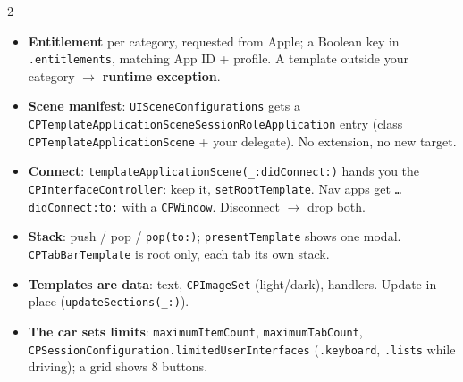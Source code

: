 \documentclass[8pt]{extarticle}
\newcommand\ct[1]{\texttt{#1}}
\newcommand\hd[1]{\par\vspace{3pt}\noindent{\bfseries\color{sheetBlue}#1}\par\vspace{1pt}}
\begin{document}
\begin{multicols}{2}
\raggedright{}

\hd{How it works}
\begin{itemize}
  \item \textbf{Entitlement} per category, requested from Apple; a Boolean key in
        \ct{.entitlements}, matching App ID + profile. A template outside your category
        $\to$ \textbf{runtime exception}.
  \item \textbf{Scene manifest}: \ct{UISceneConfigurations} gets a
        \ct{CPTemplateApplicationScene\-SessionRoleApplication} entry (class
        \ct{CPTemplateApplicationScene} + your delegate). No extension, no new target.
  \item \textbf{Connect}: \ct{templateApplicationScene(\_:didConnect:)} hands you the
        \ct{CPInterfaceController}: keep it, \ct{setRootTemplate}. Nav apps get
        \ct{\dots didConnect:to:} with a \ct{CPWindow}. Disconnect $\to$ drop both.
  \item \textbf{Stack}: push / pop / \ct{pop(to:)}; \ct{presentTemplate} shows one modal.
        \ct{CPTabBarTemplate} is root only, each tab its own stack.
  \item \textbf{Templates are data}: text, \ct{CPImageSet} (light/dark), handlers.
        Update in place (\ct{updateSections(\_:)}).
  \item \textbf{The car sets limits}: \ct{maximumItemCount}, \ct{maximumTabCount},
        \ct{CPSessionConfiguration.limitedUserInterfaces} (\ct{.keyboard}, \ct{.lists}
        while driving); a grid shows 8 buttons.
\end{itemize}


\end{multicols}
\end{document}
